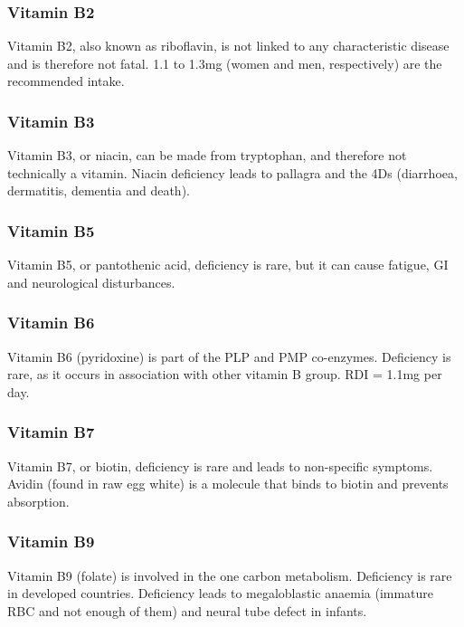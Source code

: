 \subsubsection{Vitamin B2}

Vitamin B2, also known as riboflavin, is not linked to any characteristic disease and is therefore not fatal.
1.1 to 1.3mg (women and men, respectively) are the recommended intake.

\subsubsection{Vitamin B3}

Vitamin B3, or niacin, can be made from tryptophan, and therefore not technically a vitamin.
Niacin deficiency leads to pallagra and the 4Ds (diarrhoea, dermatitis, dementia and death).

\subsubsection{Vitamin B5}

Vitamin B5, or pantothenic acid, deficiency is rare, but it can cause fatigue, GI and neurological disturbances.

\subsubsection{Vitamin B6}

Vitamin B6 (pyridoxine) is part of the PLP and PMP co-enzymes.
Deficiency is rare, as it occurs in association with other vitamin B group.
RDI = 1.1mg per day.

\subsubsection{Vitamin B7}

Vitamin B7, or biotin, deficiency is rare and leads to non-specific symptoms.
Avidin (found in raw egg white) is a molecule that binds to biotin and prevents absorption.

\subsubsection{Vitamin B9}

Vitamin B9 (folate) is involved in the one carbon metabolism.
Deficiency is rare in developed countries.
Deficiency leads to megaloblastic anaemia (immature RBC and not enough of them) and neural tube defect in infants.

